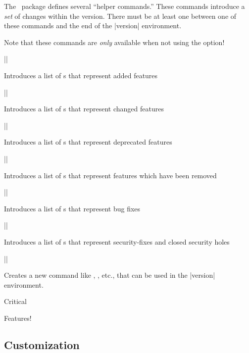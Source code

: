 \documentclass{ltxguidex}
\newcommand{\cl}{\ctan{changelog}}
\begin{document}
The \cl\ package defines several ``helper commands.'' These commands
introduce a \textit{set} of changes within the version. There must be at
least one  between one of these commands and the end of the
|version| environment.

Note that these commands are \emph{only} available when not using
the  option!

\begin{desc}|\added|\end{desc}Introduces a list of s that represent added
	features
\begin{desc}|\changed|\end{desc}Introduces a list of s that represent
	changed features
\begin{desc}|\deprecated|\end{desc}Introduces a list of s that represent
	deprecated features
\begin{desc}|\removed|\end{desc}Introduces a list of s that represent
	features which have been removed
\begin{desc}|\fixed|\end{desc}Introduces a list of s that represent bug
	fixes
\begin{desc}|\security|\end{desc}Introduces a list of s that represent
	security-fixes and closed security holes

\begin{desc}||\end{desc}
	Creates a new command like , , etc., that can be
	used in the |version| environment.

\begin{LTXexample}
\newchangelogsection
  {\critical}{Critical}
\begin{changelog}[section=false]
  \begin{version}[v=1.0.0, date=2023-02-16]
    \critical
      \item Features!
  \end{version}
\end{changelog}
\end{LTXexample}

\subsection{Customization}
\end{document}

